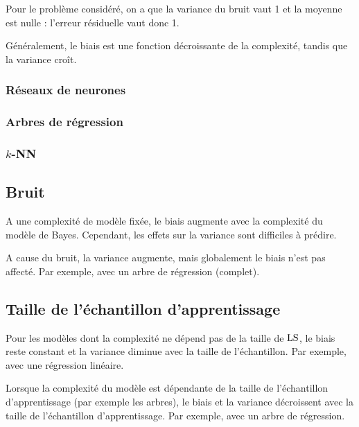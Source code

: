 		Pour le problème considéré, on a que la variance du bruit vaut 1 et la moyenne est nulle : l'erreur résiduelle vaut donc 1.
		
		
		Généralement, le biais est une fonction décroissante de la complexité, tandis que la variance croît.
		
			\subsubsection{Réseaux de neurones}
		
		
			\subsubsection{Arbres de régression}
			
			
			\subsubsection{$k$-NN}
			
		
		\subsection{Bruit}
		
		A une complexité de modèle fixée, le biais augmente avec la complexité du modèle de Bayes. Cependant, les effets sur la variance sont difficiles à prédire.
		
		A cause du bruit, la variance augmente, mais globalement le biais n'est pas affecté. Par exemple, avec un arbre de régression (complet).
		
		
		\subsection{Taille de l'échantillon d'apprentissage}
		
		Pour les modèles dont la complexité ne dépend pas de la taille de $\text{LS}$, le biais reste constant et la variance diminue avec la taille de l'échantillon. Par exemple, avec une régression linéaire.
		
		
		Lorsque la complexité du modèle est dépendante de la taille de l'échantillon d'apprentissage (par exemple les arbres), le biais et la variance décroissent avec la taille de l'échantillon d'apprentissage. Par exemple, avec un arbre de régression.
		
